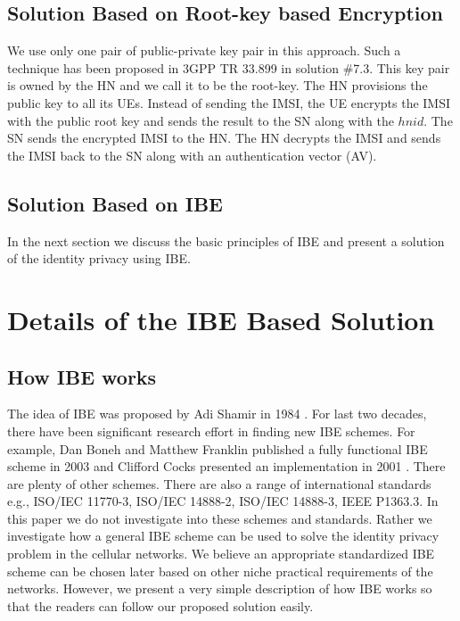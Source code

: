 \documentclass{river-journal}
\begin{document}
\subsection{Solution Based on Root-key based Encryption} 
\label{sub_sec:solution_root-key}
We use only one pair of public-private key pair in this approach. Such a technique has been proposed in 3GPP TR 33.899 in solution \#7.3. This key pair is owned by the HN and we call it to be the root-key. The HN provisions the public key to all its UEs.  Instead of sending the IMSI, the UE encrypts the IMSI with the public root key and sends the result to the SN along with the $hnid$. The SN sends the encrypted IMSI to the HN. The HN decrypts the IMSI and sends the IMSI back to the SN along with an authentication vector (AV).

\subsection{Solution Based on IBE}
In the next section we discuss the basic principles of IBE and present a solution of the identity privacy using IBE. 


\section{Details of the IBE Based Solution} 
\label{sec:solutions_based_on_IBE}
\subsection{How IBE works}
The idea of IBE was proposed by Adi Shamir in 1984 \cite{IBE_shamir}. For last two decades, there have been significant research effort in finding new IBE schemes. For example, Dan Boneh and Matthew Franklin published a fully functional IBE scheme in 2003 \cite{IBE_boneh_franklin} and Clifford Cocks presented an implementation in 2001 \cite{IBE_clifford}. There are plenty of other schemes. There are also a range of international standards e.g., ISO/IEC 11770-3, ISO/IEC 14888-2, ISO/IEC 14888-3, IEEE P1363.3. In this paper we do not investigate into these schemes and standards. Rather we investigate how a general IBE scheme can be used to solve the identity privacy problem in the cellular networks. We believe an appropriate standardized IBE scheme can be chosen later based on other niche practical requirements of the networks. However, we present a very simple description of how IBE works so that the readers can follow our proposed solution easily. 
\end{document}

